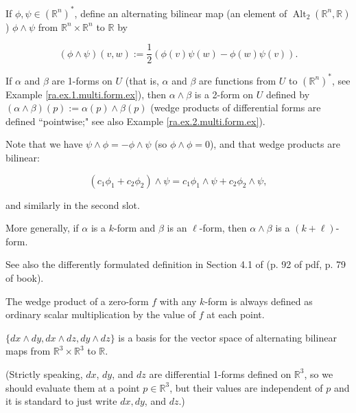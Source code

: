 \begin{definition}\label{ra.def.wedge.prod}

If \(\phi, \psi \in (\mathbb{R}^n)^*\), define an alternating bilinear map (an element of \(\operatorname{Alt}_2(\mathbb{R}^n, \mathbb{R})\)) \(\phi \wedge \psi\) from \(\mathbb{R}^n \times \mathbb{R}^n\) to \(\mathbb{R}\) by

\[
(\phi \wedge \psi)(v,w) := \frac{1}{2}(\phi(v) \psi(w) - \phi(w) \psi(v)).
\]

If \(\alpha\) and \(\beta\) are 1-forms on \(U\) (that is, \(\alpha\) and \(\beta\) are functions from \(U\) to \((\mathbb{R}^n)^*\), see Example \ref{ra.ex.1.multi.form.ex}), then \(\alpha \wedge \beta\) is a 2-form on \(U\) defined by \((\alpha \wedge \beta)(p) := \alpha(p) \wedge \beta(p)\) (wedge products of differential forms are defined ``pointwise;" see also Example \ref{ra.ex.2.multi.form.ex}).

Note that we have \(\psi \wedge \phi = - \phi \wedge \psi\) (so \(\phi \wedge \phi =0\)), and that wedge products are bilinear:

\[
(c_1 \phi_1 + c_2 \phi_2) \wedge \psi = c_1 \phi_1 \wedge \psi + c_2 \phi_2 \wedge \psi,
\]

and similarly in the second slot.

More generally, if \(\alpha\) is a \(k\)-form and \(\beta\) is an \(\ell\)-form, then \(\alpha \wedge \beta\) is a \((k+\ell)\)-form.

See also the differently formulated definition in Section 4.1 of \citet{spivak1971calculus} (p. 92 of pdf, p. 79 of book).

\end{definition}



\begin{example}\label{ra.ex.wedge.product.0}

The wedge product of a zero-form \(f\) with any \(k\)-form is always defined as ordinary scalar multiplication by the value of \(f\) at each point.

\end{example}


\begin{proposition}\label{ra.42b.hw14.prob.1}

\(\{dx \wedge dy, dx \wedge dz, dy \wedge dz\}\) is a basis for the vector space of alternating bilinear maps from \(\mathbb{R}^3 \times \mathbb{R}^3\) to \(\mathbb{R}\).

(Strictly speaking, \(dx\), \(dy\), and \(dz\) are differential 1-forms defined on \(\mathbb{R}^3\), so we should evaluate them at a point \(p \in \mathbb{R}^3\), but their values are independent of \(p\) and it is standard to just write \(dx, dy\), and \(dz\).)

\end{proposition}

